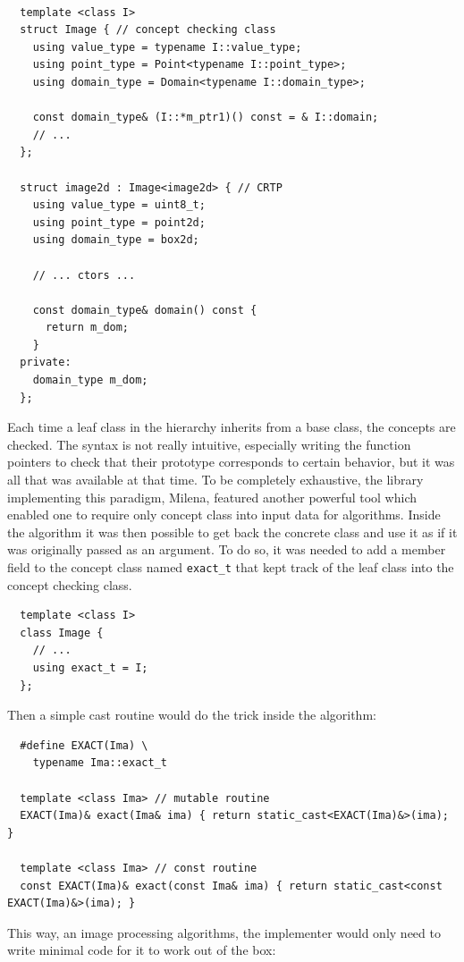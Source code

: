 \begin{verbatim}

  template <class I>
  struct Image { // concept checking class
    using value_type = typename I::value_type;
    using point_type = Point<typename I::point_type>;
    using domain_type = Domain<typename I::domain_type>;

    const domain_type& (I::*m_ptr1)() const = & I::domain;
    // ...
  };

  struct image2d : Image<image2d> { // CRTP
    using value_type = uint8_t;
    using point_type = point2d;
    using domain_type = box2d;

    // ... ctors ...

    const domain_type& domain() const {
      return m_dom;
    }
  private:
    domain_type m_dom;
  };
\end{verbatim}

Each time a leaf class in the hierarchy inherits from a base class, the concepts are checked. The syntax is not really
intuitive, especially writing the function pointers to check that their prototype corresponds to certain behavior, but
it was all that was available at that time. To be completely exhaustive, the library implementing this paradigm, Milena,
featured another powerful tool which enabled one to require only concept class into input data for algorithms. Inside
the algorithm it was then possible to get back the concrete class and use it as if it was originally passed as an
argument. To do so, it was needed to add a member field to the concept class named \texttt{exact\_t} that kept track of
the leaf class into the concept checking class.

\begin{verbatim}
  template <class I>
  class Image {
    // ...
    using exact_t = I;
  };
\end{verbatim}

Then a simple cast routine would do the trick inside the algorithm:

\begin{verbatim}
  #define EXACT(Ima) \
    typename Ima::exact_t

  template <class Ima> // mutable routine
  EXACT(Ima)& exact(Ima& ima) { return static_cast<EXACT(Ima)&>(ima); }

  template <class Ima> // const routine
  const EXACT(Ima)& exact(const Ima& ima) { return static_cast<const EXACT(Ima)&>(ima); }
\end{verbatim}

This way, an image processing algorithms, the implementer would only need to write minimal code for it to work out of
the box:

